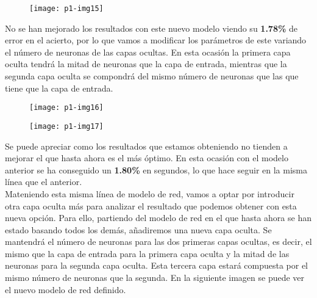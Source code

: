 \documentclass[10pt]{article}
\begin{document}
\begin{figure}[H]
	\begin{center}
 		\texttt{[image: p1-img15]}
	\end{center} 
\end{figure}

No se han mejorado los resultados con este nuevo modelo viendo su \textbf{1.78\%} de error en el acierto, por lo que vamos a modificar los parámetros de este variando el número de neuronas de las capas ocultas. En esta ocasión la primera capa oculta tendrá la mitad de neuronas que la capa de entrada, mientras que la segunda capa oculta se compondrá del mismo número de neuronas que las que tiene que la capa de entrada. \\

\begin{figure}[H]
	\begin{center}
 		\texttt{[image: p1-img16]}
	\end{center} 
\end{figure}

\begin{figure}[H]
	\begin{center}
 		\texttt{[image: p1-img17]}
	\end{center} 
\end{figure}

Se puede apreciar como los resultados que estamos obteniendo no tienden a mejorar el que hasta ahora es el más óptimo. En esta ocasión con el modelo anterior se ha conseguido un \textbf{1.80\%} en segundos, lo que hace seguir en la misma línea que el anterior. \\

Mateniendo esta misma línea de modelo de red, vamos a optar por introducir otra capa oculta más para analizar el resultado que podemos obtener con esta nueva opción. Para ello, partiendo del modelo de red en el que hasta ahora se han estado basando todos los demás, añadiremos una nueva capa oculta. Se mantendrá el número de neuronas para las dos primeras capas ocultas, es decir, el mismo que la capa de entrada para la primera capa oculta y la mitad de las neuronas para la segunda capa oculta. Esta tercera capa estará compuesta por el mismo número de neuronas que la segunda. En la siguiente imagen se puede ver el nuevo modelo de red definido. \\
\end{document}
